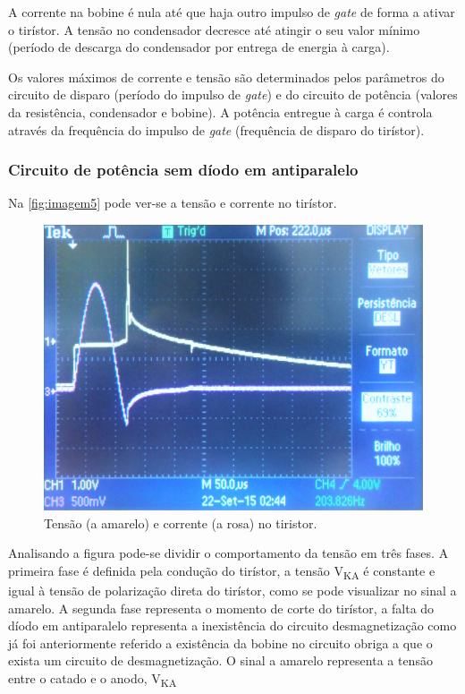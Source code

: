 \documentclass[a4paper,11pt]{article}
\numberwithin{equation}{section}
\begin{document}
	A corrente na bobine é nula até que haja outro impulso de \textit{gate} de forma a ativar o tirístor. A tensão no condensador decresce até atingir o seu valor mínimo (período de descarga do condensador por entrega de energia à carga).
	
	Os valores máximos de corrente e tensão são determinados pelos parâmetros do circuito de disparo (período do impulso de \textit{gate}) e do circuito de potência (valores da resistência, condensador e bobine).
	A potência entregue à carga é controla através da frequência  do impulso de \textit{gate} (frequência de disparo do tirístor).


\subsubsection{Circuito de potência sem díodo em antiparalelo}
Na \autoref{fig:imagem5} pode ver-se a tensão e corrente no tirístor.

\begin{figure}[h]
	\centering
	\includegraphics[keepaspectratio=true, scale=0.165]{img/imagem5}
	\caption{Tensão (a amarelo) e corrente (a rosa) no tiristor.}
	\label{fig:imagem5}
	\vspace{-0.8em}
\end{figure}
 
Analisando a figura pode-se dividir o comportamento da tensão em três fases. A primeira fase é definida pela condução do tirístor, a tensão V\textsubscript{KA} é constante e igual à tensão de polarização direta do tirístor, como se pode visualizar no sinal a amarelo. 
A segunda fase representa o momento de corte do tirístor, a falta do díodo em antiparalelo representa a inexistência do circuito desmagnetização como já foi anteriormente referido a existência da bobine no circuito obriga a que o exista um circuito de desmagnetização. 
O sinal a amarelo representa a tensão entre o catado e o anodo, V\textsubscript{KA}
\end{document}
